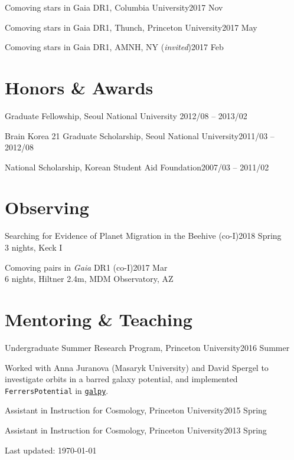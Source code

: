 \documentclass[11pt,letterpaper]{article}
\renewenvironment{itemize}{
  \begin{list}{}{
    \setlength{\leftmargin}{1.5em}
  }
}{
  \end{list}
}
\begin{document}
\begin{itemize}
  \setlength{\itemsep}{0em}

  \item Comoving stars in Gaia DR1, Columbia University\hfill 2017 Nov
  \item Comoving stars in Gaia DR1, Thunch, Princeton University\hfill 2017 May
  \item Comoving stars in Gaia DR1, AMNH, NY ({\it invited})\hfill 2017 Feb
\end{itemize}

\section*{Honors \& Awards}

\begin{itemize}
  \setlength{\itemsep}{0em}

  \item Graduate Fellowship, Seoul National University \hfill 2012/08 -- 2013/02
  \item Brain Korea 21 Graduate Scholarship, Seoul National University\hfill 2011/03 -- 2012/08
	\item National Scholarship, Korean Student Aid Foundation\hfill 2007/03 -- 2011/02
\end{itemize}

\section*{Observing}
\begin{itemize}
  \item Searching for Evidence of Planet Migration in the Beehive (co-I)\hfill 2018 Spring\\
    3 nights, Keck I
  \item Comoving pairs in {\it Gaia} DR1 (co-I)\hfill 2017 Mar\\
    6 nights, Hiltner 2.4m, MDM Observatory, AZ
\end{itemize}

\section*{Mentoring \& Teaching}

\begin{itemize}
  \setlength\itemsep{0em}
  \item Undergraduate Summer Research Program, Princeton University\hfill 2016 Summer
    \begin{adjustwidth}{15pt}{}
      Worked with Anna Juranova (Masaryk University) and David Spergel to
      investigate orbits in a barred galaxy potential, and implemented {\tt
      FerrersPotential} in \href{http://galpy.readthedocs.io/en/latest/}{\tt galpy}.
    \end{adjustwidth}
  \item Assistant in Instruction for Cosmology, Princeton University\hfill 2015 Spring
  \item Assistant in Instruction for Cosmology, Princeton University\hfill 2013 Spring
\end{itemize}

\bigskip

\begin{center}
  \begin{footnotesize}
    Last updated: \today \\
  \end{footnotesize}
\end{center}
\end{document}
